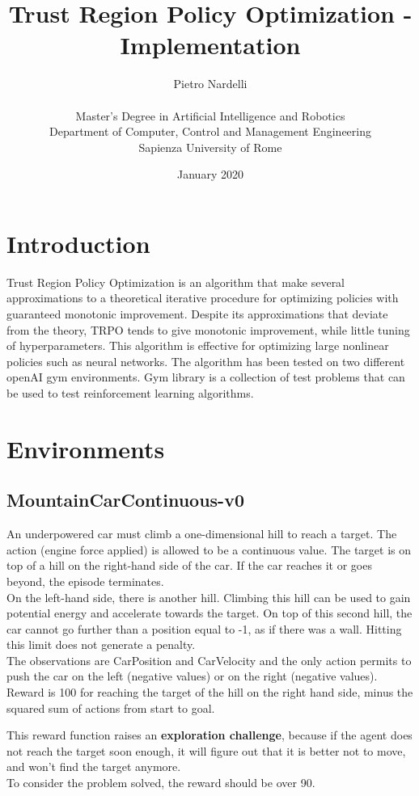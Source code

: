 \documentclass[11pt]{article}
\title{Trust Region Policy Optimization - Implementation}
\author{Pietro Nardelli \\ \\
        Master's Degree in Artificial Intelligence and Robotics \\
        Department of Computer, Control and Management Engineering \\
        Sapienza University of Rome}
\date{January 2020}
\begin{document}
\maketitle

\section{Introduction}
Trust Region Policy Optimization is an algorithm that make several
approximations to a theoretical iterative procedure for optimizing policies with
guaranteed monotonic improvement. Despite its approximations that deviate from
the theory, TRPO tends to give monotonic improvement, while little tuning of
hyperparameters. This algorithm is effective for optimizing large nonlinear
policies such as neural networks. The algorithm has been tested on two different
openAI gym environments. Gym library is a collection of test problems that can
be used to test reinforcement learning algorithms.

\section{Environments}

\subsection{MountainCarContinuous-v0}
An underpowered car must climb a one-dimensional hill to reach a target. The
action (engine force applied) is allowed to be a continuous value.
The target is on top of a hill on the right-hand side of the car. If the car reaches it or goes beyond, the episode terminates.
\\
On the left-hand side, there is another hill. Climbing this hill can be used to
gain potential energy and accelerate towards the target. On top of this second
hill, the car cannot go further than a position equal to -1, as if there was a
wall. Hitting this limit does not generate a penalty.
\\
The observations are CarPosition and CarVelocity and the only action permits to
push the car on the left (negative values) or on the right (negative values).
\\
Reward is 100 for reaching the target of the hill on the right hand side,
minus the squared sum of actions from start to goal.

This reward function raises an \textbf{exploration challenge}, because if the agent does
not reach the target soon enough, it will figure out that it is better not to move,
and won't find the target anymore.
\\
To consider the problem solved, the reward should be over 90.
\end{document}
